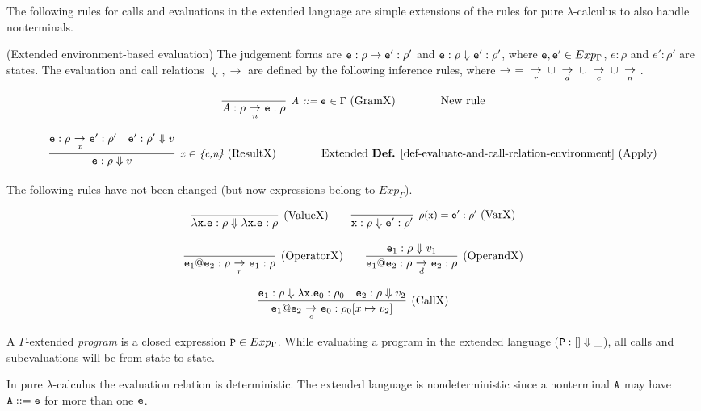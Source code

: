 \documentclass{LMCS}
\newcommand{\fl}{\noindent}
\newcommand{\bdfn}{\begin{defi}}
\newcommand{\edfn}{\end{defi}}
\theoremstyle{definition}\newtheorem{env}[thm]{Environment}
\newcommand{\tosub}[1]{\raisebox{-6.0pt}{$\ \stackrel{\textstyle\to}{\vrule height4.5 pt width0 pt
    depth2.5 pt \smash{\scriptstyle#1}}\ $}}
\begin{document}
The following rules for calls and evaluations in the extended language are simple extensions of the rules for pure $\lambda$-calculus to also handle nonterminals. 


\bdfn \label{def-environment-evaluation-ext} {\rm (Extended environment-based
evaluation)}
The judgement forms are ${\tt e }:\rho \to{\tt e}':\rho'$ and
${\tt e}:\rho \Downarrow{\tt e}':\rho'$, where ${\tt e},{\tt e'}\in Exp_\Gamma$, $e: \rho$ and $e':\rho'$ are states. 
The evaluation
and call relations $\Downarrow,\to$ are defined by the following inference rules, where
$\to\ =\tosub{r}\cup\tosub{d}\cup\tosub{c}\cup\tosub{n}$. 



$$
\infer[{\mbox{{\it \small A ::= {\tt e} $\in \Gamma$\ }}}(\textnormal{GramX})\qquad\qquad\mbox{New rule}]
{A:\rho\tosub{n} {\tt e}:\rho}
{}
$$

$$
\infer[{\mbox{{\it \small x $\in$  \{c,n\}\ }}}(\textnormal{ResultX})\qquad\qquad\mbox{Extended {\bf Def.} \ref{def-evaluate-and-call-relation-environment} (Apply)}]
{{\tt e}:\rho \Downarrow v}
{{\tt e}:\rho \tosub{x} {\tt e}':\rho'
  &
  {\tt e}':\rho'\Downarrow v}
$$



\fl The following rules have not been changed (but now expressions
belong to $Exp_\Gamma$).
\smallskip

$$
\infer[(\textnormal{ValueX})]{\lambda{\tt x.e}:\rho \Downarrow
  \lambda{\tt x.e}:\rho}{}
\qquad
\infer[{\mbox{\small $\rho({\tt x})= {\tt e}':\rho'$\ }}(\textnormal{VarX})]
{{\tt x}:\rho\Downarrow {\tt e}':\rho'}
{}
$$

$$
\infer[(\textnormal{OperatorX})]
{{\tt e}_1{\tt@e}_2:\rho \tosub{r}{\tt e}_1:\rho}
{}
\qquad
\infer[(\textnormal{OperandX})]
{{\tt e}_1{\tt@e}_2:\rho \tosub{d}{\tt e}_2:\rho}
{{\tt e}_1:\rho\Downarrow v_1}
$$

$$
\infer[(\textnormal{CallX})]
{{\tt e}_1{\tt@e}_2\tosub{c} {\tt e}_0:\rho_0[x\mapsto v_2]}
{{\tt e}_1:\rho \Downarrow\lambda{\tt x.e}_0:\rho_0
  &
  {\tt e}_2:\rho\Downarrow v_2}
$$
\edfn 


A $\Gamma$-extended {\em program} is a closed expression $ {\tt P}\in
Exp_\Gamma$.  While evaluating a program in the extended language
(${\tt P}:[]\Downarrow \_$), all calls and subevaluations will be from
state to state.

In pure $\lambda$-calculus the evaluation relation is
deterministic. The extended language is nondeterministic since a
nonterminal ${\tt A}$ may have ${\tt A}::={\tt e}$ for more than one
${\tt e}$.
\end{document}
